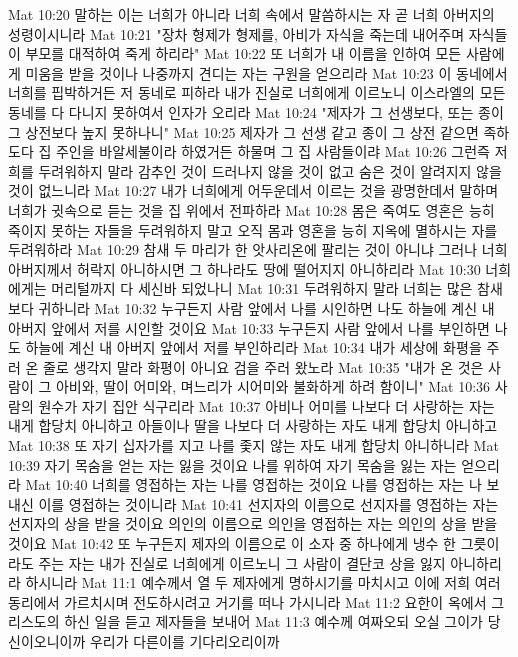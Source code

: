 Mat 10:20  말하는 이는 너희가 아니라 너희 속에서 말씀하시는 자 곧 너희 아버지의 성령이시니라
Mat 10:21  "장차 형제가 형제를, 아비가 자식을 죽는데 내어주며 자식들이 부모를 대적하여 죽게 하리라"
Mat 10:22  또 너희가 내 이름을 인하여 모든 사람에게 미움을 받을 것이나 나중까지 견디는 자는 구원을 얻으리라
Mat 10:23  이 동네에서 너희를 핍박하거든 저 동네로 피하라 내가 진실로 너희에게 이르노니 이스라엘의 모든 동네를 다 다니지 못하여서 인자가 오리라
Mat 10:24  "제자가 그 선생보다, 또는 종이 그 상전보다 높지 못하나니"
Mat 10:25  제자가 그 선생 같고 종이 그 상전 같으면 족하도다 집 주인을 바알세불이라 하였거든 하물며 그 집 사람들이랴
Mat 10:26  그런즉 저희를 두려워하지 말라 감추인 것이 드러나지 않을 것이 없고 숨은 것이 알려지지 않을 것이 없느니라
Mat 10:27  내가 너희에게 어두운데서 이르는 것을 광명한데서 말하며 너희가 귓속으로 듣는 것을 집 위에서 전파하라
Mat 10:28  몸은 죽여도 영혼은 능히 죽이지 못하는 자들을 두려워하지 말고 오직 몸과 영혼을 능히 지옥에 멸하시는 자를 두려워하라
Mat 10:29  참새 두 마리가 한 앗사리온에 팔리는 것이 아니냐 그러나 너희 아버지께서 허락지 아니하시면 그 하나라도 땅에 떨어지지 아니하리라
Mat 10:30  너희에게는 머리털까지 다 세신바 되었나니
Mat 10:31  두려워하지 말라 너희는 많은 참새보다 귀하니라
Mat 10:32  누구든지 사람 앞에서 나를 시인하면 나도 하늘에 계신 내 아버지 앞에서 저를 시인할 것이요
Mat 10:33  누구든지 사람 앞에서 나를 부인하면 나도 하늘에 계신 내 아버지 앞에서 저를 부인하리라
Mat 10:34  내가 세상에 화평을 주러 온 줄로 생각지 말라 화평이 아니요 검을 주러 왔노라
Mat 10:35  "내가 온 것은 사람이 그 아비와, 딸이 어미와, 며느리가 시어미와 불화하게 하려 함이니"
Mat 10:36  사람의 원수가 자기 집안 식구리라
Mat 10:37  아비나 어미를 나보다 더 사랑하는 자는 내게 합당치 아니하고 아들이나 딸을 나보다 더 사랑하는 자도 내게 합당치 아니하고
Mat 10:38  또 자기 십자가를 지고 나를 좇지 않는 자도 내게 합당치 아니하니라
Mat 10:39  자기 목숨을 얻는 자는 잃을 것이요 나를 위하여 자기 목숨을 잃는 자는 얻으리라
Mat 10:40  너희를 영접하는 자는 나를 영접하는 것이요 나를 영접하는 자는 나 보내신 이를 영접하는 것이니라
Mat 10:41  선지자의 이름으로 선지자를 영접하는 자는 선지자의 상을 받을 것이요 의인의 이름으로 의인을 영접하는 자는 의인의 상을 받을 것이요
Mat 10:42  또 누구든지 제자의 이름으로 이 소자 중 하나에게 냉수 한 그릇이라도 주는 자는 내가 진실로 너희에게 이르노니 그 사람이 결단코 상을 잃지 아니하리라 하시니라
Mat 11:1  예수께서 열 두 제자에게 명하시기를 마치시고 이에 저희 여러 동리에서 가르치시며 전도하시려고 거기를 떠나 가시니라
Mat 11:2  요한이 옥에서 그리스도의 하신 일을 듣고 제자들을 보내어
Mat 11:3  예수께 여짜오되 오실 그이가 당신이오니이까 우리가 다른이를 기다리오리이까
